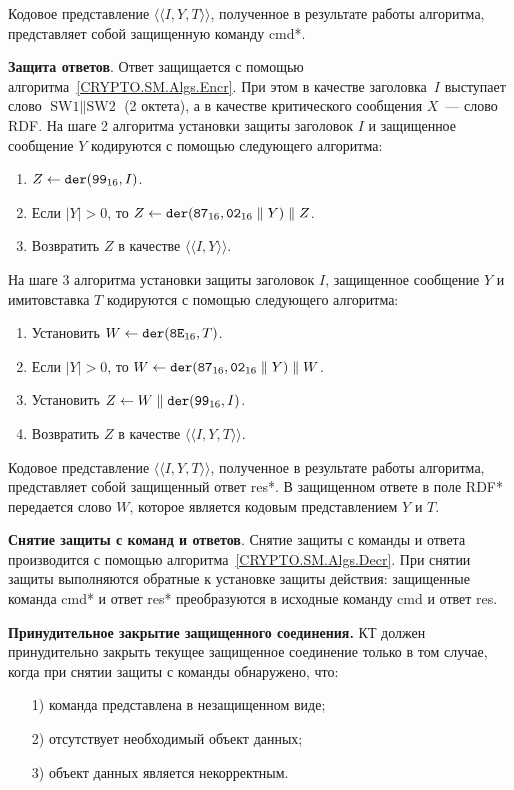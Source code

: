 Кодовое представление $\langle\langle I, Y, T \rangle\rangle$, полученное 
в результате работы алгоритма, представляет собой защищенную команду cmd*. 

{\bf Защита ответов}. 
Ответ защищается с помощью алгоритма~\ref{CRYPTO.SM.Algs.Encr}. При этом в 
качестве заголовка~$I$ выступает слово $\text{SW1} \parallel\text{SW2}$ 
(2 октета), а в качестве критического сообщения $X$~--- слово RDF. 
На шаге 2 алгоритма установки защиты заголовок $I$ и защищенное сообщение $Y$ 
кодируются с помощью следующего алгоритма: 

\begin{enumerate}
\item
$Z\gets \texttt{der}(\texttt{99}_{16}, I)$.
\item
Если $|Y| > 0$,  то $Z\gets \texttt{der}(\texttt{87}_{16}, \texttt{02}_{16} \parallel Y) \parallel Z$. 
\item
Возвратить $Z$ в качестве $\langle\langle I, Y \rangle\rangle$.
\end{enumerate}

На шаге 3 алгоритма установки защиты заголовок $I$, защищенное сообщение $Y$ и 
имитовставка $T$ кодируются с помощью следующего алгоритма: 

\begin{enumerate}
\item 
Установить $W\gets\texttt{der}(\texttt{8E}_{16}, T)$.
\item 
Если $|Y| > 0$, 
то $W \gets \texttt{der}(\texttt{87}_{16}, \texttt{02}_{16}\parallel Y) \parallel W$.
\item
Установить $Z \gets W \parallel \texttt{der}(\texttt{99}_{16}, I)$.
\item
Возвратить $Z$ в качестве $\langle \langle I, Y, T\rangle\rangle$.
\end{enumerate}

Кодовое представление  $\langle\langle I, Y, T \rangle\rangle$, 
полученное в результате работы алгоритма, 
представляет собой защищенный ответ res*. 
В защищенном ответе в поле RDF* передается слово $W$, 
которое является кодовым представлением $Y$ и $T$. 

{\bf Снятие защиты с команд и ответов}. 
%
Снятие защиты с команды и ответа производится с помощью 
алгоритма~\ref{CRYPTO.SM.Algs.Decr}.  
При снятии защиты выполняются обратные к установке защиты действия: 
защищенные команда cmd* и ответ res* преобразуются в исходные команду cmd  
и ответ res.  

{\bf Принудительное закрытие защищенного соединения.}
%
КТ должен принудительно закрыть текущее защищенное соединение только в том случае, 
когда при снятии защиты с команды обнаружено, что: 
\begin{enumerate}
\item[1)] команда представлена в незащищенном виде;
\item[2)] отсутствует необходимый объект данных;
\item[3)] объект данных является некорректным.
\end{enumerate}


